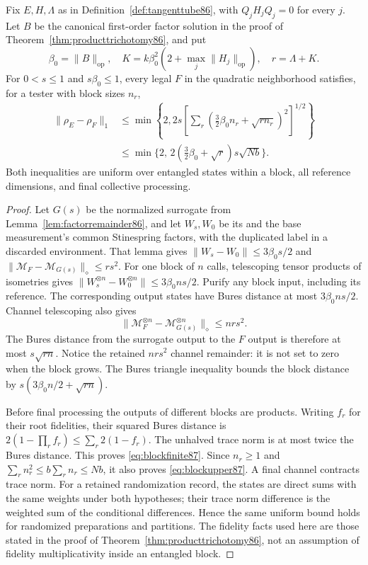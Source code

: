 \begin{lemma}\label{lem:blockbures87}
Fix $E,H,\Lambda$ as in Definition~\ref{def:tangenttube86}, with
$Q_jH_jQ_j=0$ for every $j$.  Let $B$ be the canonical first-order
factor solution in the proof of Theorem~\ref{thm:producttrichotomy86},
and put
\[
 \beta_0=\|B\|_{\mathrm{op}},\quad
 K=k\beta_0^2(2+\max_j\|H_j\|_{\mathrm{op}}),\quad r=\Lambda+K.
\]
For $0<s\le1$ and $s\beta_0\le1$, every legal $F$ in the
quadratic neighborhood satisfies, for a tester with block sizes $n_r$,
\begin{align}
 \|\rho_E-\rho_F\|_1
 &\le \min\left\{2,
  2s\left[\sum_r
       (\tfrac32\beta_0n_r+\sqrt{rn_r})^2\right]^{1/2}\right\}
                                                        \label{eq:blockfinite87}\\
 &\le\min\{2,\,2(\tfrac32\beta_0+\sqrt r)s\sqrt{Nb}\}.
                                                        \label{eq:blockupper87}
\end{align}
Both inequalities are uniform over entangled states within a block,
all reference dimensions, and final collective processing.
\end{lemma}
\begin{proof}
Let $G(s)$ be the normalized surrogate from
Lemma~\ref{lem:factorremainder86}, and let $W_s,W_0$ be its and the
base measurement's common Stinespring factors, with the duplicated
label in a discarded environment.  That lemma gives
$\|W_s-W_0\|\le3\beta_0s/2$ and
$\|\mathcal M_F-\mathcal M_{G(s)}\|_\diamond\le rs^2$.
For one block of $n$ calls, telescoping tensor products of isometries
gives $\|W_s^{\otimes n}-W_0^{\otimes n}\|\le3\beta_0ns/2$.
Purify any block input, including its reference.  The corresponding
output states have Bures distance at most $3\beta_0ns/2$.
Channel telescoping also gives
\[
 \|\mathcal M_F^{\otimes n}-\mathcal M_{G(s)}^{\otimes n}\|_\diamond
 \le nrs^2.
\]
The Bures distance from the surrogate output to the $F$ output is
therefore at most $s\sqrt{rn}$.  Notice the retained $nrs^2$
channel remainder: it is not set to zero when the block grows.
The Bures triangle inequality bounds the block distance by
$s(3\beta_0n/2+\sqrt{rn})$.

Before final processing the outputs of different blocks are products.
Writing $f_r$ for their root fidelities, their squared Bures distance
is $2(1-\prod_rf_r)\le\sum_r2(1-f_r)$.  The unhalved trace
norm is at most twice the Bures distance.  This proves
\eqref{eq:blockfinite87}.  Since $n_r\ge1$ and
$\sum_rn_r^2\le b\sum_rn_r\le Nb$, it also proves
\eqref{eq:blockupper87}.  A final channel contracts trace norm.
For a retained randomization record, the states are direct sums with
the same weights under both hypotheses; their trace norm difference
is the weighted sum of the conditional differences.  Hence the same
uniform bound holds for randomized preparations and partitions.
The fidelity facts used here are those stated in the proof of
Theorem~\ref{thm:producttrichotomy86}, not an assumption of fidelity
multiplicativity inside an entangled block.
\end{proof}

